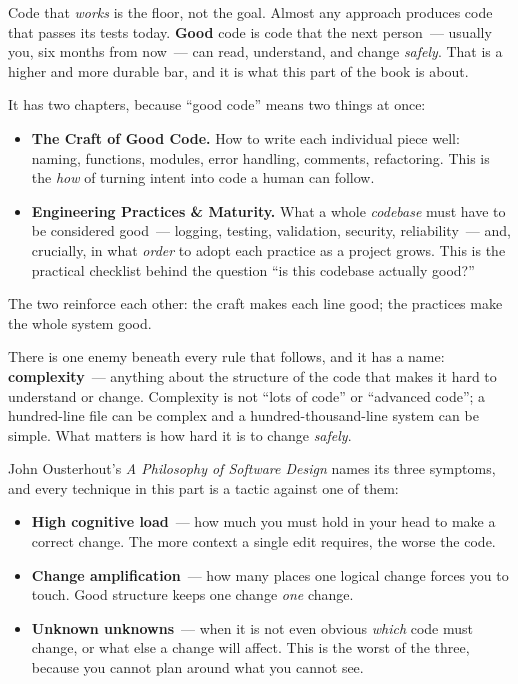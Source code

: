\label{ch:writing-good-code}

\chapterrule

Code that \emph{works} is the floor, not the goal. Almost any approach produces code that passes its
tests today. \textbf{Good} code is code that the next person~--- usually you, six months from now~--- can
read, understand, and change \emph{safely}. That is a higher and more durable bar, and it is what this part of the book is about.

It has two chapters, because ``good code'' means two things at once:

\begin{itemize}
\tightlist
\item
  \textbf{The Craft of Good Code.} How to write each individual piece well: naming, functions, modules,
  error handling, comments, refactoring. This is the \emph{how} of turning intent into code a human can
  follow.
\item
  \textbf{Engineering Practices \& Maturity.} What a whole \emph{codebase} must have to be considered
  good~--- logging, testing, validation, security, reliability~--- and, crucially, in what \emph{order} to
  adopt each practice as a project grows. This is the practical checklist behind the question ``is
  this codebase actually good?''
\end{itemize}

\noindent{}The two reinforce each other: the craft makes each line good; the practices make the whole system
good.

\label{writing-good-code:what-good-code-actually-means}

There is one enemy beneath every rule that follows, and it has a name: \textbf{complexity}~--- anything
about the structure of the code that makes it hard to understand or change. Complexity is not ``lots
of code'' or ``advanced code''; a hundred-line file can be complex and a hundred-thousand-line system
can be simple. What matters is how hard it is to change \emph{safely}.

John Ousterhout's \emph{A Philosophy of Software Design} names its three symptoms, and every technique
in this part is a tactic against one of them:

\begin{itemize}
\tightlist
\item
  \textbf{High cognitive load}~--- how much you must hold in your head to make a correct change. The more
  context a single edit requires, the worse the code.
\item
  \textbf{Change amplification}~--- how many places one logical change forces you to touch. Good structure
  keeps one change \emph{one} change.
\item
  \textbf{Unknown unknowns}~--- when it is not even obvious \emph{which} code must change, or what else a change
  will affect. This is the worst of the three, because you cannot plan around what you cannot see.
\end{itemize}

